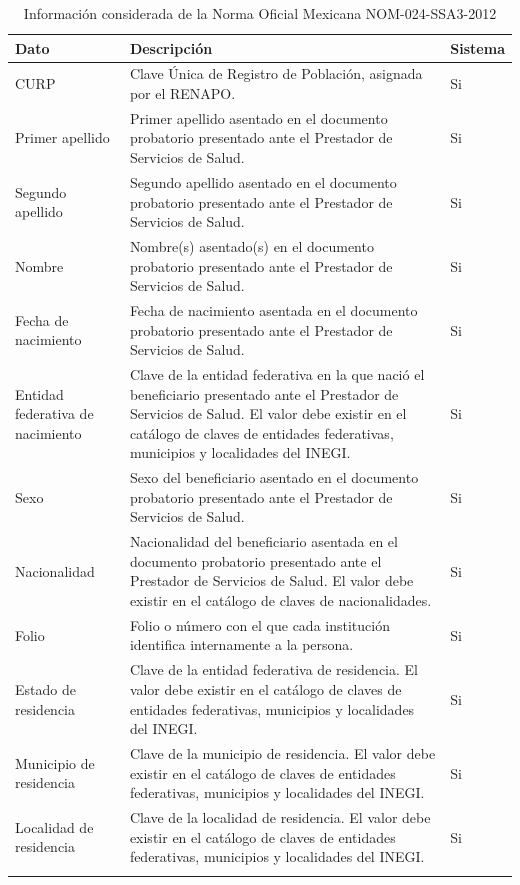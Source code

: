 \setlength\LTleft{-0.5cm}
\begin{longtable}{|p{4cm}|p{10.5cm}|p{2cm}|}
\hline\textbf{Dato} & \textbf{Descripción} & \textbf{Sistema} \\ \hline
CURP
& Clave Única de Registro de Población, asignada por el RENAPO.
& Si\\ \hline

Primer apellido
& Primer apellido asentado en el documento probatorio presentado ante el Prestador de Servicios de Salud.
& Si\\ \hline

Segundo apellido
& Segundo apellido asentado en el documento probatorio presentado ante el Prestador de Servicios de Salud.
& Si\\ \hline

Nombre
& Nombre(s) asentado(s) en el documento probatorio presentado ante el Prestador de Servicios de Salud.
& Si\\ \hline

Fecha de nacimiento
& Fecha de nacimiento asentada en el documento probatorio presentado ante el Prestador de Servicios de Salud.
& Si\\ \hline

Entidad federativa de nacimiento
& Clave de la entidad federativa en la que nació el beneficiario presentado ante el Prestador de Servicios de Salud. El valor debe existir en el catálogo de claves de entidades federativas, municipios y localidades del INEGI.
& Si\\ \hline

Sexo
& Sexo del beneficiario asentado en el documento probatorio presentado ante el Prestador de Servicios de Salud.
& Si\\ \hline

Nacionalidad
& Nacionalidad del beneficiario asentada en el documento probatorio presentado ante el Prestador de Servicios de Salud. El valor debe existir en el catálogo de claves de nacionalidades.
& Si\\ \hline

Folio
& Folio o número con el que cada institución identifica internamente a la persona.
& Si\\ \hline

Estado de residencia
& Clave de la entidad federativa de residencia. El valor debe existir en el catálogo de claves de entidades federativas, municipios y localidades del INEGI.
& Si\\ \hline

Municipio de residencia
& Clave de la municipio de residencia. El valor debe existir en el catálogo de claves de entidades federativas, municipios y localidades del INEGI.
& Si\\ \hline

Localidad de residencia
& Clave de la localidad de residencia. El valor debe existir en el catálogo de claves de entidades federativas, municipios y localidades del INEGI.
& Si\\ \hline
\caption{Información considerada de la Norma Oficial Mexicana NOM-024-SSA3-2012}
\label{table:1}
\end{longtable}


